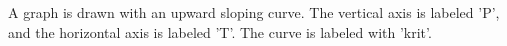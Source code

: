 A graph is drawn with an upward sloping curve. The vertical axis is labeled 'P', and the horizontal axis is labeled 'T'. The curve is labeled with 'krit'.